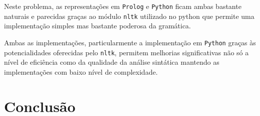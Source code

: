 \documentclass[12pt,a4paper,oneside]{article}
\begin{document}
Neste problema, as representações em \texttt{Prolog} e \texttt{Python} ficam ambas bastante
naturais e parecidas graças ao módulo \texttt{nltk} utilizado no python que permite uma
implementação simples mas bastante poderosa da gramática.

Ambas as implementações, particularmente a implementação em \texttt{Python} graças às
potencialidades oferecidas pelo \texttt{nltk}, permitem melhorias significativas não só a
nível de eficiência como da qualidade da análise sintática mantendo as implementações com
baixo nível de complexidade.



\section{Conclusão}
\label{sec:conc}

\lipsum[1]

\lipsum[2]



\end{document}
